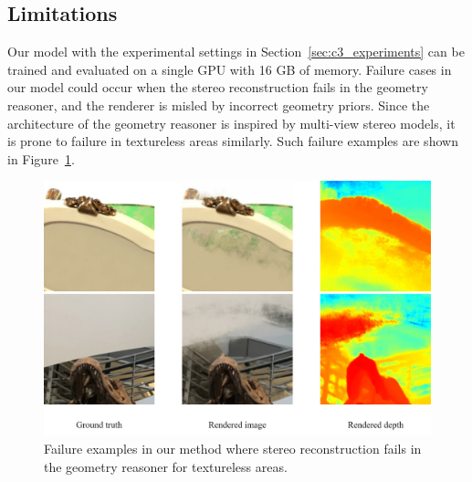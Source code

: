 \subsection{Limitations} \label{sec:c3_limitations}
Our model with the experimental settings in Section~\ref{sec:c3_experiments} can be trained and evaluated on a single GPU with 16 GB of memory. Failure cases in our model could occur when the stereo reconstruction fails in the geometry reasoner, and the renderer is misled by incorrect geometry priors. Since the architecture of the geometry reasoner is inspired by multi-view stereo models, it is prone to failure in textureless areas similarly. Such failure examples are shown in Figure~\ref{fig:c3_failure}.

\begin{figure}[!t]
	\begin{center}
		\includegraphics[width=1.0\linewidth]{images/chapter3/figures/failure.jpg}
	\end{center}
	\caption{Failure examples in our method where stereo reconstruction fails in the geometry reasoner for textureless areas.}
	\label{fig:c3_failure}
\end{figure}
